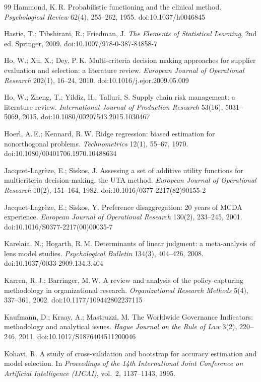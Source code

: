 \documentclass[10pt,twocolumn,a4paper]{article}
\begin{document}
\begin{thebibliography}{99}
 Hammond, K.\,R. Probabilistic functioning and the clinical method.
\emph{Psychological Review} 62(4), 255--262, 1955. doi:10.1037/h0046845

 Hastie, T.; Tibshirani, R.; Friedman, J. \emph{The Elements of
Statistical Learning}, 2nd ed. Springer, 2009. doi:10.1007/978-0-387-84858-7

 Ho, W.; Xu, X.; Dey, P.\,K. Multi-criteria decision making approaches
for supplier evaluation and selection: a literature review. \emph{European Journal of
Operational Research} 202(1), 16--24, 2010. doi:10.1016/j.ejor.2009.05.009

 Ho, W.; Zheng, T.; Yildiz, H.; Talluri, S. Supply chain risk
management: a literature review. \emph{International Journal of Production Research}
53(16), 5031--5069, 2015. doi:10.1080/00207543.2015.1030467

 Hoerl, A.\,E.; Kennard, R.\,W. Ridge regression: biased estimation for
nonorthogonal problems. \emph{Technometrics} 12(1), 55--67, 1970.
doi:10.1080/00401706.1970.10488634

 Jacquet-Lagr\`eze, E.; Siskos, J. Assessing a set of additive utility
functions for multicriteria decision-making, the UTA method. \emph{European Journal of
Operational Research} 10(2), 151--164, 1982. doi:10.1016/0377-2217(82)90155-2

 Jacquet-Lagr\`eze, E.; Siskos, Y. Preference disaggregation: 20 years
of MCDA experience. \emph{European Journal of Operational Research} 130(2), 233--245,
2001. doi:10.1016/S0377-2217(00)00035-7

 Karelaia, N.; Hogarth, R.\,M. Determinants of linear judgment: a
meta-analysis of lens model studies. \emph{Psychological Bulletin} 134(3), 404--426,
2008. doi:10.1037/0033-2909.134.3.404

 Karren, R.\,J.; Barringer, M.\,W. A review and analysis of the
policy-capturing methodology in organizational research. \emph{Organizational Research
Methods} 5(4), 337--361, 2002. doi:10.1177/109442802237115

 Kaufmann, D.; Kraay, A.; Mastruzzi, M. The Worldwide Governance
Indicators: methodology and analytical issues. \emph{Hague Journal on the Rule of Law}
3(2), 220--246, 2011. doi:10.1017/S1876404511200046

 Kohavi, R. A study of cross-validation and bootstrap for accuracy
estimation and model selection. In \emph{Proceedings of the 14th International Joint
Conference on Artificial Intelligence (IJCAI)}, vol.~2, 1137--1143, 1995.


\end{thebibliography}
\end{document}

